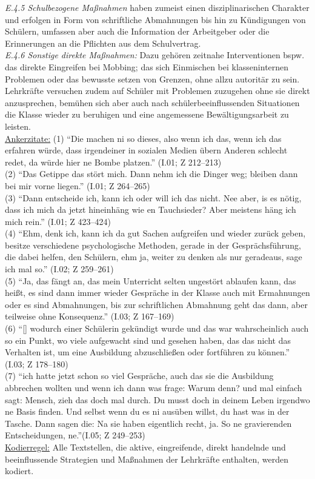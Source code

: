 \textit{E.4.5 Schulbezogene Maßnahmen} haben zumeist einen disziplinarischen Charakter und erfolgen in Form von schriftliche Abmahnungen bis hin zu Kündigungen von Schülern, umfassen aber auch die Information der Arbeitgeber oder die Erinnerungen an die Pflichten aus dem Schulvertrag.\\
\textit{E.4.6 Sonstige direkte Maßnahmen:} Dazu gehören zeitnahe Interventionen bspw. das direkte Eingreifen bei Mobbing; das sich Einmischen bei klasseninternen Problemen oder das bewusste setzen von Grenzen, ohne allzu autoritär zu sein. Lehrkräfte versuchen zudem auf Schüler mit Problemen zuzugehen ohne sie direkt anzusprechen, bemühen sich aber auch nach schülerbeeinflussenden Situationen die Klasse wieder zu beruhigen und eine angemessene Bewältigungsarbeit zu leisten.\\
\underline{Ankerzitate:} (1) "`Die machen ni so dieses, also wenn ich das, wenn ich das erfahren würde, dass irgendeiner in sozialen Medien übern Anderen schlecht redet, da würde hier ne Bombe platzen."' (I.01; Z 212--213)\\ (2) "`Das Getippe das stört mich. Dann nehm ich die Dinger weg; bleiben dann bei mir vorne liegen."' (I.01; Z 264--265)\\ (3) "`Dann entscheide ich, kann ich oder will ich das nicht. Nee aber, is es nötig, dass ich mich da jetzt hineinhäng wie en Tauchsieder? Aber meistens häng ich mich rein."' (I.01; Z 423--424)\\ (4) "`Ehm, denk ich, kann ich da gut Sachen aufgreifen und wieder zurück geben, besitze verschiedene psychologische Methoden, gerade in der Gesprächsführung, die dabei helfen, den Schülern, ehm ja, weiter zu denken als nur geradeaus, sage ich mal so."' (I.02; Z 259--261)\\ (5) "`Ja, das fängt an, das mein Unterricht selten ungestört ablaufen kann, das heißt, es sind dann immer wieder Gespräche in der Klasse auch mit Ermahnungen oder es sind Abmahnungen, bis zur schriftlichen Abmahnung geht das dann, aber teilweise ohne Konsequenz."' (I.03; Z 167--169)\\ (6) "`[\punkte] wodurch einer Schülerin gekündigt wurde und das war wahrscheinlich auch so ein Punkt, wo viele aufgewacht sind und gesehen haben, das das nicht das Verhalten ist, um eine Ausbildung abzuschließen oder fortführen zu können."' (I.03; Z 178--180)\\ (7) "`ich hatte jetzt schon so viel Gespräche, auch das sie die Ausbildung abbrechen wollten und wenn ich dann was frage: Warum denn? und mal einfach sagt: Mensch, zieh das doch mal durch. Du musst doch in deinem Leben irgendwo ne Basis finden. Und selbst wenn du es ni ausüben willst, du hast was in der Tasche. Dann sagen die: Na sie haben eigentlich recht, ja. So ne gravierenden Entscheidungen, ne."'(I.05; Z 249--253)\\
\underline{Kodierregel:} Alle Textstellen, die aktive, eingreifende, direkt handelnde und beeinflussende Strategien und Maßnahmen der Lehrkräfte enthalten, werden kodiert.\\

